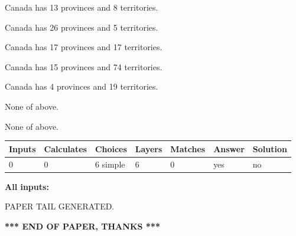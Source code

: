 \documentclass[12pt]{article}
\begin{document}
 
Canada has  13 provinces and  8 territories.
 
 
Canada has  26 provinces and  5 territories.
 
 
Canada has  17 provinces and  17 territories.
 
 
Canada has  15 provinces and  74 territories.
 
 
Canada has   4 provinces and  19 territories.
 
 
 None of above.
 
 
\noindent{}
 
 
 None of above.
 
 
\noindent{}
 
 
   
   
   
   
\noindent\begin{tabular}{|l|l|l|l|l|l|l|}
 \hline
Inputs & Calculates & Choices & Layers & Matches & Answer & Solution \\ \hline
 0  & 
 0  & 
 6
  simple  
  & 
 6  & 
 0  & 
  yes & 
  no 
  \\ \hline
 \end{tabular}
   
   
   
   
\noindent{}
   
   
   
   
\noindent\vspace{0.1in}\hspace{-0.08in} {\textbf{\Large{All inputs: }}}
   
   
   
   
   
   
 \vspace{0.2in}
 
   
   
\vspace{2.0in} PAPER TAIL GENERATED.
   
   
   
   
\vspace{1.0in} 
{\textbf{\large{ *** END OF PAPER, THANKS *** }}} 
   
\end{document}
